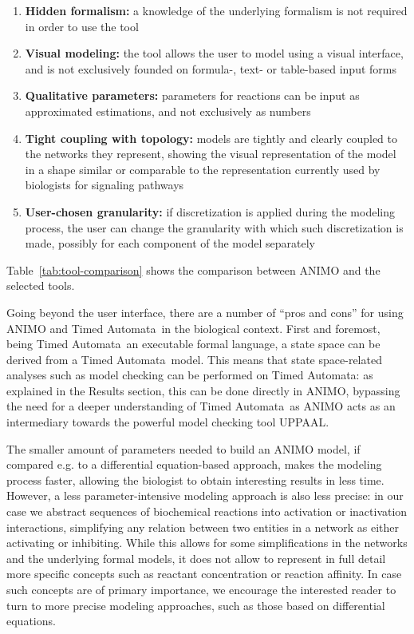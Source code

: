 \documentclass{bmcart}
\def\tas{Timed Automata}
\begin{document}
\begin{enumerate}
  \item {\bf Hidden formalism:} a knowledge of the underlying formalism is not required in order to use the tool
  \item {\bf Visual modeling:} the tool allows the user to model using a visual interface, and is not exclusively
      founded on formula-, text- or table-based input forms
  \item {\bf Qualitative parameters:} parameters for reactions can be input as approximated estimations, and not exclusively as numbers
  \item {\bf Tight coupling with topology:} models are tightly and clearly coupled to the networks they represent, showing the visual
      representation of the model in a shape similar or comparable to the representation currently used by biologists
      for signaling pathways
  \item {\bf User-chosen granularity:} if discretization is applied during the modeling process, the user can change the granularity
      with which such discretization is made, possibly for each component of the model separately
\end{enumerate}
Table~\ref{tab:tool-comparison} shows the comparison between ANIMO and the selected tools.

Going beyond the user interface, there are a number of ``pros and cons'' for using ANIMO and \tas\ 
in the biological context. First and foremost, being \tas\ an executable formal language,
a state space can be derived from a \tas\ model. This means that state space-related analyses
such as model checking can be performed on \tas: as explained in the Results section, this can
be done directly in ANIMO, bypassing the need for a deeper understanding of \tas\ as
ANIMO acts as an intermediary towards the powerful model checking tool UPPAAL.

The smaller amount of parameters needed to build an ANIMO model, if compared e.g. to
a differential equation-based approach, makes the modeling process faster, allowing
the biologist to obtain interesting results in less time. However, a less
parameter-intensive modeling approach is also less precise: in our case we abstract
sequences of biochemical reactions into activation or inactivation interactions,
simplifying any relation between two entities in a network as either activating or
inhibiting. While this allows for some simplifications in the networks and the underlying
formal models, it does not allow to represent in full detail more specific concepts
such as reactant concentration or reaction affinity. In case such concepts are of
primary importance, we encourage the interested reader to turn to more precise
modeling approaches, such as those based on differential equations.
\end{document}
